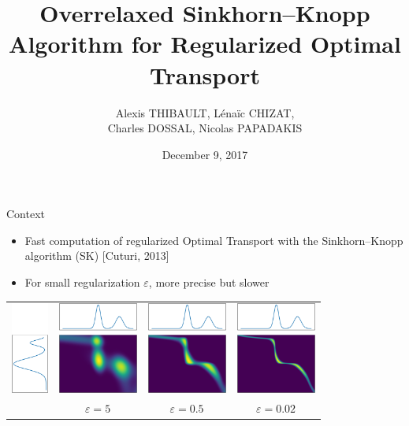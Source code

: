 \documentclass[compress]{beamer}
\title[Overrelaxed SK Algorithm]{Overrelaxed Sinkhorn--Knopp Algorithm for Regularized Optimal Transport}
\author[A. THIBAULT]{
	Alexis THIBAULT, 
	L\'ena\"ic CHIZAT,\\
	Charles DOSSAL,
	Nicolas PAPADAKIS
}
\institute[OTML'17]{Optimal Transport and Machine Learning workshop \\ NIPS 2017}
\date{December 9, 2017}
\renewcommand{\epsilon}{\varepsilon}
\begin{document}
\titlepage

\begin{frame}
{Context} 
\begin{itemize}
\item Fast computation of regularized Optimal Transport with the Sinkhorn--Knopp algorithm (SK) {\color{blue}[Cuturi, 2013]}
\item For small regularization $\epsilon$, more precise but slower
\end{itemize}
\begin{tabular}{c c c c}
	\includegraphics[height=3cm]{1d_interp_mu} &
	\includegraphics[height=3cm]{1d_interp_0_2} &
	\includegraphics[height=3cm]{1d_interp_2} &
	\includegraphics[height=3cm]{1d_interp_18} \\
	&
	$\epsilon = 5$ &
	$\epsilon = 0.5$ &
	$\epsilon = 0.02$
\end{tabular}
\end{frame}


\begin{frame}
	\tableofcontents
\end{frame}
\end{document}
